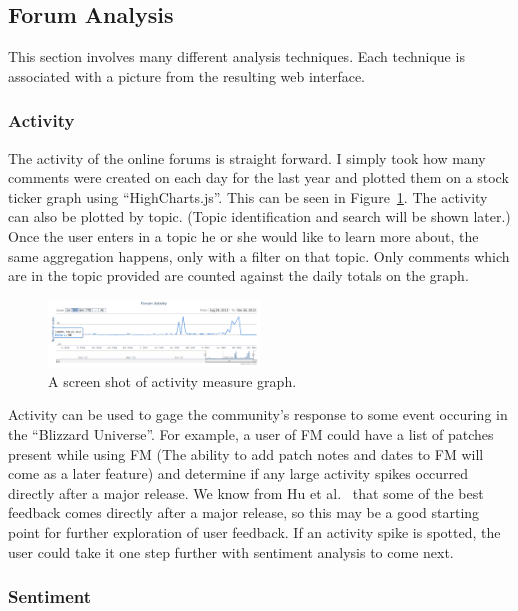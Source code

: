 \documentclass[conference]{IEEEtran}
\begin{document}
\subsection{Forum Analysis}

This section involves many different analysis techniques. Each technique is associated with a picture from
the resulting web interface.

\subsubsection{Activity}

The activity of the online forums is straight forward. I simply took how many comments were created on each
day for the last year and plotted them on a stock ticker graph using ``HighCharts.js''. This can be seen in
Figure~\ref{fig:activity}. The activity can also be plotted by topic. (Topic identification and search will
be shown later.) Once the user enters in a topic he or she would like to learn more about, the same aggregation
happens, only with a filter on that topic. Only comments which are in the topic provided are counted against
the daily totals on the graph.

\begin{figure}[h]
\centering
\includegraphics[width=0.5\textwidth]{images/activity.png}
\caption{A screen shot of activity measure graph.\label{fig:activity}}
\end{figure}

Activity can be used to gage the community's response to some event occuring in the ``Blizzard Universe''.
For example, a user of FM could have a list of patches present while using FM (The ability to add patch notes
and dates to FM will come as a later feature) and determine if any large activity spikes occurred directly
after a major release. We know from Hu et al.~\cite{Hu:2004:MSC} that some of the best feedback comes directly
after a major release, so this may be a good starting point for further exploration of user feedback. If an
activity spike is spotted, the user could take it one step further with sentiment analysis to come next.

\subsubsection{Sentiment}
\end{document}
